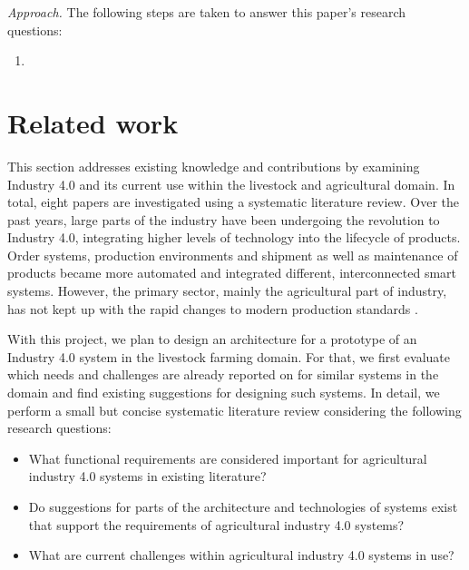 \documentclass[conference]{IEEEtran}
\begin{document}
\emph{Approach.}
The following steps are taken to answer this paper's research questions:
\begin{enumerate}
    \item
\end{enumerate}



\section{Related work}
\label{sec:related_work}
This section addresses existing knowledge and contributions by examining Industry 4.0 and its current use within the livestock and agricultural domain. In total, eight papers are investigated using a systematic literature review.
\newline
Over the past years, large parts of the industry have been undergoing the revolution to Industry 4.0, integrating higher levels of technology into the lifecycle of products. Order systems, production environments and shipment as well as maintenance of products became more automated and integrated different, interconnected smart systems.
However, the primary sector, mainly the agricultural part of industry, has not kept up with the rapid changes to modern production standards \cite{pr7010036}.

With this project, we plan to design an architecture for a prototype of an Industry 4.0 system in the livestock farming domain. For that, we first evaluate which needs and challenges are already reported on for similar systems in the domain and find existing suggestions for designing such systems.
In detail, we perform a small but concise systematic literature review considering the following research questions:
\newline
\begin{itemize}
    \item What functional requirements are considered important for agricultural industry 4.0 systems in existing literature?
    \item Do suggestions for parts of the architecture and technologies of systems exist that support the requirements of agricultural industry 4.0 systems?
    \item What are current challenges within agricultural industry 4.0 systems in use?
\end{itemize}
\end{document}

